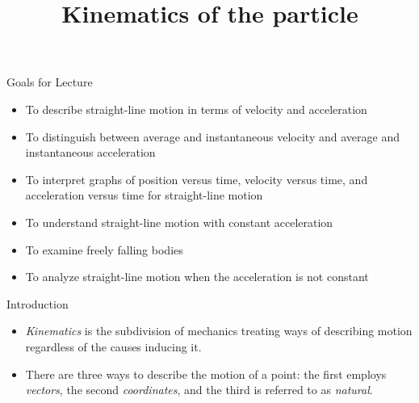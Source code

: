 \documentclass[18pt]{LectMechanics}
\title[Physics 1]{\huge\bfseries Kinematics of the particle}
\date{}
\begin{document}
%
\begin{frame}
	\titlepage
\end{frame}
\usebackgroundtemplate{
}




\begin{frame}{Goals for Lecture}{}
	\begin{itemize}
		\item To describe straight-line motion in terms of velocity and acceleration
		\item To distinguish between average and instantaneous velocity and average and instantaneous acceleration
		\item To interpret graphs of position versus time, velocity versus time, and acceleration versus time for straight-line motion
		\item To understand straight-line motion with constant acceleration
		\item To examine freely falling bodies
		\item To analyze straight-line motion when the acceleration is not constant
	\end{itemize}
\end{frame}


\begin{frame}{Introduction}{}
	\begin{itemize}
		\item \emph{Kinematics} is the subdivision of mechanics treating ways of describing motion regardless of the causes inducing it.
		\item There are three ways to describe the motion of a point: the first employs \emph{vectors}, the second \emph{coordinates}, and the third is referred to as \emph{natural}.
	\end{itemize}
\end{frame}
\end{document}
